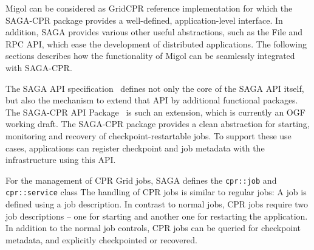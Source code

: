 \documentclass[conference,final]{IEEEtran}
\newcommand{\up}{\vspace*{-1em}}
\begin{document}
Migol can be considered as GridCPR reference implementation for which
the SAGA-CPR package provides a well-defined, application-level
interface.  In addition, SAGA provides various other useful
abstractions, such as the File and RPC API, which ease the development
of distributed applications. The following sections describes how the
functionality of Migol can be seamlessly integrated with SAGA-CPR.



\up
{}

\up The SAGA API specification~\cite{saga_gfd90} defines not only the
core of the SAGA API itself, but also the mechanism to extend that API
by additional functional packages.  The SAGA-CPR API
Package~\cite{saga_cpr_draft} is such an extension, which is currently
an OGF working draft.  The SAGA-CPR package provides a clean
abstraction for starting, monitoring and recovery of
checkpoint-restartable jobs.
To support these use cases, applications can register checkpoint and job metadata with the infrastructure using this API. 

For the management of CPR Grid jobs, SAGA defines the
\texttt{cpr::job} and \texttt{cpr::service} class 
The handling of CPR jobs is similar to regular jobs: A job is defined
using a job description. In contrast to normal jobs, CPR jobs require
two job descriptions -- one for starting and another one for
restarting the application.
In addition to the normal job controls, CPR jobs can be queried for
checkpoint metadata, and explicitly checkpointed or recovered.

\end{document}
